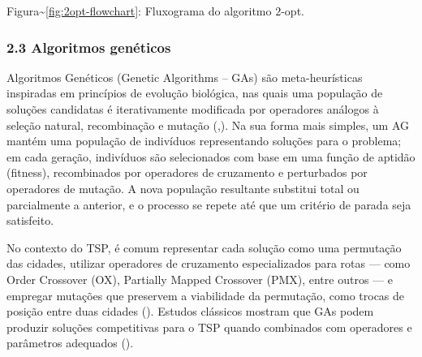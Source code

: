 Figura\textasciitilde{}\ref{fig:2opt-flowchart}: Fluxograma do algoritmo
\(2\)-opt.

\begin{Shaded}
\begin{Highlighting}[]





\end{Highlighting}
\end{Shaded}

\subsubsection{2.3 Algoritmos
genéticos}\label{sec-23-algoritmos-geneticos}

Algoritmos Genéticos (Genetic Algorithms -- GAs) são meta-heurísticas
inspiradas em princípios de evolução biológica, nas quais uma população
de soluções candidatas é iterativamente modificada por operadores
análogos à seleção natural, recombinação e mutação
(,).
Na sua forma mais simples, um AG mantém uma população de indivíduos
representando soluções para o problema; em cada geração, indivíduos são
selecionados com base em uma função de aptidão (fitness), recombinados
por operadores de cruzamento e perturbados por operadores de mutação. A
nova população resultante substitui total ou parcialmente a anterior, e
o processo se repete até que um critério de parada seja satisfeito.

No contexto do TSP, é comum representar cada solução como uma permutação
das cidades, utilizar operadores de cruzamento especializados para rotas
--- como Order Crossover (OX), Partially Mapped Crossover (PMX), entre
outros --- e empregar mutações que preservem a viabilidade da
permutação, como trocas de posição entre duas cidades
(). Estudos clássicos mostram que
GAs podem produzir soluções competitivas para o TSP quando combinados
com operadores e parâmetros adequados
().

